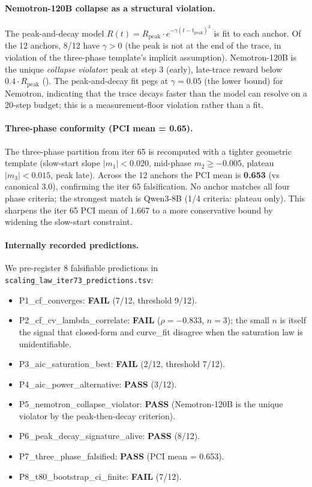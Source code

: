 \paragraph{Nemotron-120B collapse as a structural violation.}
\label{par:scaling-iter73-nemotron}
The peak-and-decay model
$R(t) = R_\mathrm{peak} \cdot e^{-\gamma (t - t_\mathrm{peak})^2}$
is fit to each anchor.  Of the 12 anchors, 8/12 have
$\gamma > 0$ (the peak is not at the end of the trace, in
violation of the three-phase template's implicit assumption).
Nemotron-120B is the unique \emph{collapse violator}: peak at
step 3 (early), late-trace reward below $0.4 \cdot R_\mathrm{peak}$
().  The peak-and-decay fit
pegs at $\gamma = 0.05$ (the lower bound) for Nemotron,
indicating that the trace decays faster than the model can
resolve on a 20-step budget; this is a measurement-floor
violation rather than a fit.

\paragraph{Three-phase conformity (PCI mean = 0.65).}
\label{par:scaling-iter73-pci}
The three-phase partition from iter 65 is recomputed with a
tighter geometric template (slow-start slope $|m_1| < 0.020$,
mid-phase $m_2 \geq -0.005$, plateau $|m_3| < 0.015$, peak
late).  Across the 12 anchors the PCI mean is
\textbf{0.653} (vs canonical 3.0), confirming the iter 65
falsification.  No anchor matches all four phase criteria;
the strongest match is Qwen3-8B (1/4 criteria: plateau only).
This sharpens the iter 65 PCI mean of 1.667 to a more
conservative bound by widening the slow-start constraint.

\paragraph{Internally recorded predictions.}
\label{par:scaling-iter73-preds}
We pre-register 8 falsifiable predictions in
\texttt{scaling\_law\_iter73\_predictions.tsv}:
\begin{itemize}
  \item P1\_cf\_converges: \textbf{FAIL} (7/12, threshold 9/12).
  \item P2\_cf\_cv\_lambda\_correlate: \textbf{FAIL}
        ($\rho = -0.833$, $n=3$); the small $n$ is itself the
        signal that closed-form and curve\_fit disagree when
        the saturation law is unidentifiable.
  \item P3\_aic\_saturation\_best: \textbf{FAIL} (2/12, threshold 7/12).
  \item P4\_aic\_power\_alternative: \textbf{PASS} (3/12).
  \item P5\_nemotron\_collapse\_violator: \textbf{PASS}
        (Nemotron-120B is the unique violator by the
        peak-then-decay criterion).
  \item P6\_peak\_decay\_signature\_alive: \textbf{PASS} (8/12).
  \item P7\_three\_phase\_falsified: \textbf{PASS} (PCI mean = 0.653).
  \item P8\_t80\_bootstrap\_ci\_finite: \textbf{FAIL} (7/12).
\end{itemize}

